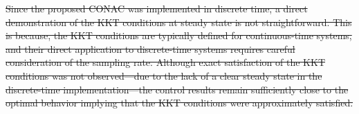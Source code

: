 \documentclass[letterpaper, journal]{IEEEtran}
\providecommand{\DIFdel}[1]{{\protect\color{red}\sout{#1}}} %
\providecommand{\DIFdelbegin}{} %
\providecommand{\DIFdelend}{} %
\begin{document}
    \DIFdelbegin \DIFdel{Since the proposed CONAC was implemented in discrete time, a direct demonstration of the KKT conditions at steady state is not straightforward. 
    This is because, the KKT conditions are typically defined for continuous-time systems, and their direct application to discrete-time systems requires careful consideration of the sampling rate.
    Although exact satisfaction of the KKT conditions was not observed—due to the lack of a clear steady state in the discrete-time implementation—the control results remain sufficiently close to the optimal behavior implying that the KKT conditions were approximately satisfied.
}\DIFdelend %
\end{document}
